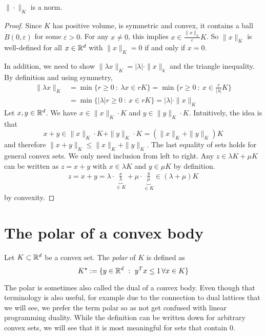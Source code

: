 \begin{lemma}
  $\|\cdot\|_K$ is a norm.
\end{lemma}
\begin{proof}
  Since $K$ has positive volume, is symmetric and convex,
  it contains a ball $B(0,\varepsilon)$ for some $\varepsilon > 0$.
  For any $x \neq 0$, this implies $x \in \frac{\|x\|_2}{\varepsilon} K$.
  So $\|x\|_K$ is well-defined for all $x \in \mathbb{R}^d$
  with $\|x\|_K = 0$ if and only if $x = 0$.

  In addition, we need to show $\|\lambda x\|_K = |\lambda| \cdot \|x\|_k$
  and the triangle inequality.
  By definition and using symmetry,
  \begin{align*}
    \|\lambda x\|_K
      &= \min\{ r \geq 0 ~:~ \lambda x \in r K \}
      = \min\{ r \geq 0 ~:~ x \in \frac{r}{|\lambda|} K \}
 \\ & = \min\{ |\lambda| r \geq 0 ~:~ x \in r K \}
      = |\lambda| \cdot \|x\|_K
  \end{align*}
  Let $x, y \in \mathbb{R}^d$.
  We have $x \in \|x\|_K \cdot K$ and $y \in \|y\|_K \cdot K$.
  Intuitively, the idea is that
  \[
    x + y \in \|x\|_K \cdot K + \|y\|_K \cdot K = (\|x\|_K + \|y\|_K) K
  \]
  and therefore $\|x+y\|_K \leq \|x\|_K + \|y\|_K$.
  The last equality of sets holds for general convex sets.
  We only need inclusion from left to right.
  Any $z \in \lambda K + \mu K$ can be written as $z = x + y$
  with $x \in \lambda K$ and $y \in \mu K$ by definition.
  \begin{align*}
    z = x + y = \lambda \cdot \underbrace{\frac{x}{\lambda}}_{\in K}
      + \mu \cdot \underbrace{\frac{y}{\mu}}_{\in K} \in (\lambda + \mu) K
  \end{align*}
  by convexity.
\end{proof}



\section{The polar of a convex body}

\begin{definition}
  Let $K \subset \mathbb{R}^d$ be a convex set.
  The \emph{polar} of $K$ is defined as
  \[
    K^\star := \{ y \in \mathbb{R}^d ~:~ y^Tx \leq 1 \,\forall x \in K \}
  \]
\end{definition}

The polar is sometimes also called the dual of a convex body.
Even though that terminology is also useful,
for example due to the connection to dual lattices that we will see,
we prefer the term polar so as not get confused with linear programming duality.
While the definition can be written down for arbitrary convex sets,
we will see that it is most meaningful for sets that contain $0$.

